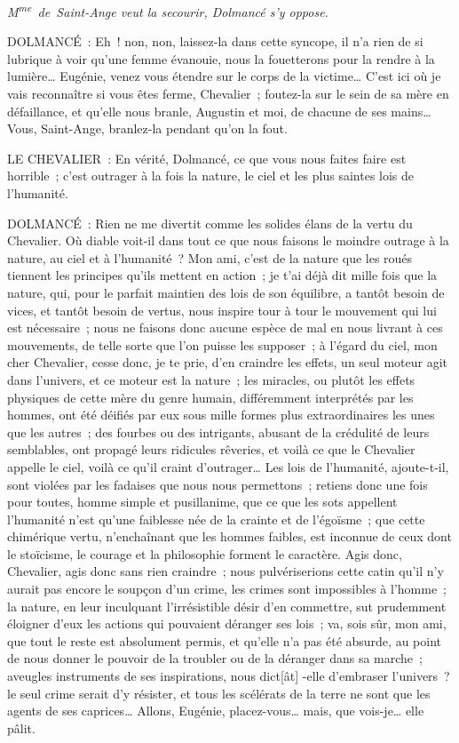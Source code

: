\documentclass[french,twoside]{book} %
\begin{document}
{\itshape M\textsuperscript{me} de Saint-Ange veut la secourir, Dolmancé s’y oppose. }\par
DOLMANCÉ : Eh ! non, non, laissez-la dans cette syncope, il n’a rien de si lubrique à voir qu’une femme évanouie, nous la fouetterons pour la rendre à la lumière… Eugénie, venez vous étendre sur le corps de la victime… C’est ici où je vais reconnaître si vous êtes ferme, Chevalier ; foutez-la sur le sein de sa mère en défaillance, et qu’elle nous branle, Augustin et moi, de chacune de ses mains… Vous, Saint-Ange, branlez-la pendant qu’on la fout.\par
LE CHEVALIER : En vérité, Dolmancé, ce que vous nous faites faire est horrible ; c’est outrager à la fois la nature, le ciel et les plus saintes lois de l’humanité.\par
DOLMANCÉ : Rien ne me divertit comme les solides élans de la vertu du Chevalier. Où diable voit-il dans tout ce que nous faisons le moindre outrage à la nature, au ciel et à l’humanité ? Mon ami, c’est de la nature que les roués tiennent les principes qu’ils mettent en action ; je t’ai déjà dit mille fois que la nature, qui, pour le parfait maintien des lois de son équilibre, a tantôt besoin de vices, et tantôt besoin de vertus, nous inspire tour à tour le mouvement qui lui est nécessaire ; nous ne faisons donc aucune espèce de mal en nous livrant à ces mouvements, de telle sorte que l’on puisse les supposer ; à l’égard du ciel, mon cher Chevalier, cesse donc, je te prie, d’en craindre les effets, un seul moteur agit dans l’univers, et ce moteur est la nature ; les miracles, ou plutôt les effets physiques de cette mère du genre humain, différemment interprétés par les hommes, ont été déifiés par eux sous mille formes plus extraordinaires les unes que les autres ; des fourbes ou des intrigants, abusant de la crédulité de leurs semblables, ont propagé leurs ridicules rêveries, et voilà ce que le Chevalier appelle le ciel, voilà ce qu’il craint d’outrager… Les lois de l’humanité, ajoute-t-il, sont violées par les fadaises que nous nous permettons ; retiens donc une fois pour toutes, homme simple et pusillanime, que ce que les sots appellent l’humanité n’est qu’une faiblesse née de la crainte et de l’égoïsme ; que cette chimérique vertu, n’enchaînant que les hommes faibles, est inconnue de ceux dont le stoïcisme, le courage et la philosophie forment le caractère. Agis donc, Chevalier, agis donc sans rien craindre ; nous pulvériserions cette catin qu’il n’y aurait pas encore le soupçon d’un crime, les crimes sont impossibles à l’homme ; la nature, en leur inculquant l’irrésistible désir d’en commettre, sut prudemment éloigner d’eux les actions qui pouvaient déranger ses lois ; va, sois sûr, mon ami, que tout le reste est absolument permis, et qu’elle n’a pas été absurde, au point de nous donner le pouvoir de la troubler ou de la déranger dans sa marche ; aveugles instruments de ses inspirations, nous dict[ât] -elle d’embraser l’univers ? le seul crime serait d’y résister, et tous les scélérats de la terre ne sont que les agents de ses caprices… Allons, Eugénie, placez-vous… mais, que vois-je… elle pâlit.\par
\end{document}
